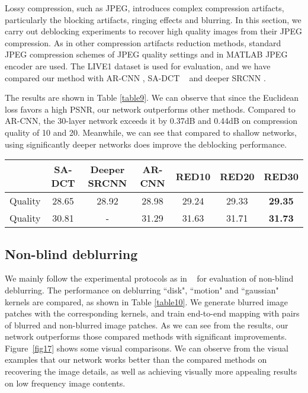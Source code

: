 \documentclass[10pt,journal,compsoc]{IEEEtran}
\begin{document}
Lossy compression, such as JPEG, introduces complex compression artifacts,
particularly the blocking artifacts, ringing effects and blurring. In this
section, we carry out deblocking experiments to recover high quality images
from their JPEG compression. As in other compression artifacts reduction methods,
standard JPEG compression schemes of JPEG quality settings  and  in
MATLAB JPEG encoder are used. The LIVE1 dataset is used for evaluation, and we
have compared our method with AR-CNN \cite{DBLP:conf/iccv/DongDLT15}, SA-DCT
~\cite{DBLP:journals/tip/FoiKE07} and deeper SRCNN \cite{DBLP:conf/iccv/DongDLT15}.

The results are shown in Table \ref{table9}. We can observe that since the
Euclidean loss favors a high PSNR, our network outperforms other methods.
Compared to AR-CNN, the 30-layer network exceeds it by 0.37dB and 0.44dB on
compression quality of 10 and 20. Meanwhile, we can see that compared to
shallow networks, using significantly deeper networks does improve the deblocking performance.

\begin{table*}[htb!]
\centering
\caption{JPEG compression deblock: average PSNR results of LIVE1.}
\begin{tabular}{c|c c c c c c} \hline
              &SA-DCT   &Deeper SRCNN   &AR-CNN   &RED10   &RED20  &RED30           \\ \hline
  Quality   &28.65  	&28.92          &28.98    &29.24   &29.33  &\textbf{29.35}  \\ \hline
  Quality   &30.81  	&-              &31.29    &31.63   &31.71  &\textbf{31.73}  \\ \hline
\end{tabular}
\label{table9}
\end{table*}



\subsection{Non-blind deblurring}

We mainly follow the experimental protocols as in ~\cite{DBLP:conf/nips/XuRLJ14} for
evaluation of non-blind deblurring. The performance on deblurring ``disk", ``motion"
and ``gaussian" kernels are compared, as shown in Table \ref{table10}. We generate
blurred image patches with the corresponding kernels, and train end-to-end
mapping with pairs of blurred and non-blurred image patches. As we can see from the results,
our network outperforms those compared methods with significant improvements. Figure~\ref{fig17} shows some visual comparisons.
We can observe from the visual examples
that our network works better than the compared methods on recovering the image details,
as well as achieving visually more appealing results on low frequency image contents.
\end{document}
